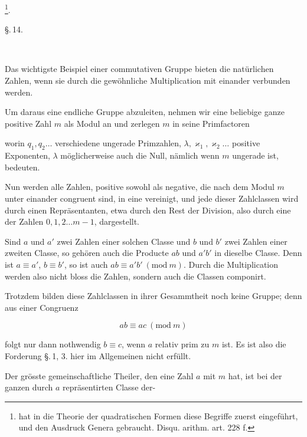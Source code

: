 
\footnote{ hat in die Theorie der quadratischen Formen diese Begriffe zuerst eingeführt, und den Ausdruck \glqq Genera\grqq{} gebraucht. Disqu. arithm. art. 228 f.}.

\begin{center}
\S.\,14.
\end{center}

\begin{center}
\\
\end{center}

Das wichtigste Beispiel einer commutativen Gruppe bieten die natürlichen Zahlen, wenn sie durch die gewöhnliche Multiplication mit einander verbunden werden.

Um daraus eine endliche Gruppe abzuleiten, nehmen wir eine beliebige ganze positive Zahl $m$ als Modul an und zerlegen $m$ in seine Primfactoren


worin $q_1, q_2 \ldots$ verschiedene ungerade Primzahlen, $\lambda, \varkappa_1, \varkappa_2 \ldots$ positive Exponenten, $\lambda$ möglicherweise auch die Null, nämlich wenn $m$ ungerade ist, bedeuten.

Nun werden alle Zahlen, positive sowohl als negative, die nach dem Modul $m$ unter einander congruent sind, in eine  vereinigt, und jede dieser Zahlclassen wird durch einen Repräsentanten, etwa durch den Rest der Division, also durch eine der Zahlen $0, 1, 2 \ldots m-1$, dargestellt.

Sind $a$ und $a'$ zwei Zahlen einer solchen Classe und $b$ und $b'$ zwei Zahlen einer zweiten Classe, so gehören auch die Producte $ab$ und $a'b'$ in dieselbe Classe. Denn ist $a \equiv a'$, $b \equiv b'$, so ist auch $ab \equiv a'b'\ (\mathrm{mod}\ m)$. Durch die Multiplication werden also nicht bloss die Zahlen, sondern auch die Classen componirt.

Trotzdem bilden diese Zahlclassen in ihrer Gesammtheit noch keine Gruppe; denn aus einer Congruenz

\[
ab \equiv ac\ (\mathrm{mod}\ m)
\]

folgt nur dann nothwendig $b \equiv c$, wenn $a$ relativ prim zu $m$ ist. Es ist also die Forderung \S.\,1, 3. hier im Allgemeinen nicht erfüllt.

Der grösste gemeinschaftliche Theiler, den eine Zahl $a$ mit $m$ hat, ist bei der ganzen durch $a$ repräsentirten Classe der-
